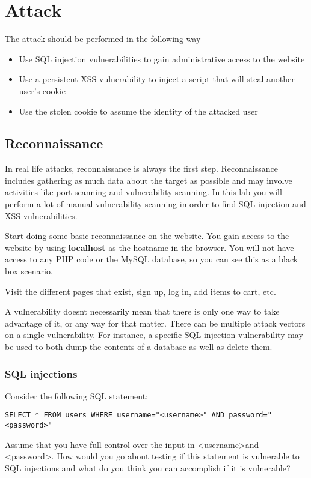 \documentclass[EITN41]{../tex/cryptosecuritylab}
\begin{document}
\section{Attack}
The attack should be performed in the following way
\begin{itemize}
\item Use SQL injection vulnerabilities to gain administrative access to the website
\item Use a persistent XSS vulnerability to inject a script that will steal another user's cookie
\item Use the stolen cookie to assume the identity of the attacked user
\end{itemize}
\subsection{Reconnaissance} 
In real life attacks, reconnaissance is always the first step. 
Reconnaissance includes gathering as much data about the target as possible 
and may involve activities like port scanning and vulnerability scanning. 
In this lab you will perform a lot of manual vulnerability scanning in order 
to find SQL injection and XSS vulnerabilities. 

Start doing some basic reconnaissance on the website. 
You gain access to the website by using \textbf{localhost} as the hostname in the browser. 
You will not have access to any PHP code or the MySQL database, 
so you can see this as a black box scenario.

Visit the different pages that exist, sign up, log in, add items to cart, etc.

A vulnerability doesnt necessarily mean that there is only one way to take advantage of it, 
or any way for that matter. There can be multiple attack vectors on a single vulnerability. 
For instance, a specific SQL injection vulnerability may be used to both dump the contents 
of a database as well as delete them.

\subsubsection{SQL injections}

\bprepass
\item Consider the following SQL statement: 
\begin{verbatim} 
SELECT * FROM users WHERE username="<username>" AND password="<password>"
\end{verbatim}
Assume that you have full control over the input in \textless username\textgreater and \textless  password\textgreater. How would you go about testing if this statement is vulnerable to SQL injections and what do you think you can accomplish if it is vulnerable?
\end{document}
